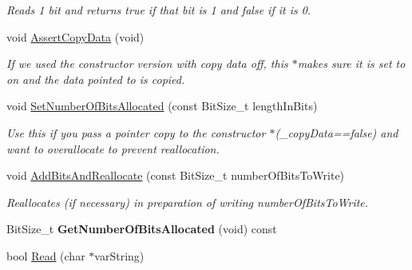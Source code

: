 \begin{DoxyCompactItemize}
\begin{DoxyCompactList}\small\item\em Reads 1 bit and returns true if that bit is 1 and false if it is 0. \end{DoxyCompactList}\item 
\hypertarget{class_rak_net_1_1_bit_stream_a0c4d4693f8fa98c3fa757da57fcb0c5d}{void \hyperlink{class_rak_net_1_1_bit_stream_a0c4d4693f8fa98c3fa757da57fcb0c5d}{Assert\-Copy\-Data} (void)}\label{class_rak_net_1_1_bit_stream_a0c4d4693f8fa98c3fa757da57fcb0c5d}

\begin{DoxyCompactList}\small\item\em If we used the constructor version with copy data off, this $\ast$makes sure it is set to on and the data pointed to is copied. \end{DoxyCompactList}\item 
\hypertarget{class_rak_net_1_1_bit_stream_aba6bd33c456e1593e002207bc3ec5c28}{void \hyperlink{class_rak_net_1_1_bit_stream_aba6bd33c456e1593e002207bc3ec5c28}{Set\-Number\-Of\-Bits\-Allocated} (const Bit\-Size\-\_\-t length\-In\-Bits)}\label{class_rak_net_1_1_bit_stream_aba6bd33c456e1593e002207bc3ec5c28}

\begin{DoxyCompactList}\small\item\em Use this if you pass a pointer copy to the constructor $\ast$(\-\_\-copy\-Data==false) and want to overallocate to prevent reallocation. \end{DoxyCompactList}\item 
\hypertarget{class_rak_net_1_1_bit_stream_a8ee4d3114fcce22de87644241dcdd39b}{void \hyperlink{class_rak_net_1_1_bit_stream_a8ee4d3114fcce22de87644241dcdd39b}{Add\-Bits\-And\-Reallocate} (const Bit\-Size\-\_\-t number\-Of\-Bits\-To\-Write)}\label{class_rak_net_1_1_bit_stream_a8ee4d3114fcce22de87644241dcdd39b}

\begin{DoxyCompactList}\small\item\em Reallocates (if necessary) in preparation of writing number\-Of\-Bits\-To\-Write. \end{DoxyCompactList}\item 
\hypertarget{class_rak_net_1_1_bit_stream_ab42caa760bf394b0d28d5106d548f7b1}{Bit\-Size\-\_\-t {\bfseries Get\-Number\-Of\-Bits\-Allocated} (void) const }\label{class_rak_net_1_1_bit_stream_ab42caa760bf394b0d28d5106d548f7b1}

\item 
\hypertarget{class_rak_net_1_1_bit_stream_ac554b5dff8da17052d12ed620bb8cf53}{bool \hyperlink{class_rak_net_1_1_bit_stream_ac554b5dff8da17052d12ed620bb8cf53}{Read} (char $\ast$var\-String)}\label{class_rak_net_1_1_bit_stream_ac554b5dff8da17052d12ed620bb8cf53}


\end{DoxyCompactItemize}
